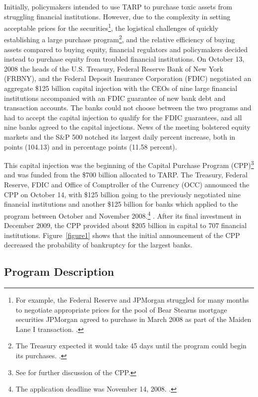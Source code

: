 \documentclass[12pt]{article}
\begin{document}
Initially, policymakers intended to use TARP to purchase toxic assets from struggling financial institutions. However, due to the complexity in setting acceptable prices for the securities\footnote{For example, the Federal Reserve and JPMorgan struggled for many months to negotiate appropriate prices for the pool of Bear Stearns mortgage securities JPMorgan agreed to purchase in March 2008 as part of the Maiden Lane I transaction. \citep{Geithner}.}, the logistical challenges of quickly establishing a large purchase program\footnote{The Treasury expected it would take 45 days until the program could begin its purchases. \citep{Geithner}.}, and the relative efficiency of buying assets compared to buying equity, financial regulators and policymakers decided instead to purchase equity from troubled financial institutions. On October 13, 2008 the heads of the U.S. Treasury, Federal Reserve Bank of New York (FRBNY), and the Federal Deposit Insurance Corporation (FDIC) negotiated an aggregate \$125 billion capital injection with the CEOs of nine large financial institutions accompanied with an FDIC guarantee of new bank debt and transaction accounts. The banks could not choose between the two programs and had to accept the capital injection to qualify for the FDIC guarantees, and all nine banks agreed to the capital injections. News of the meeting bolstered equity markets and the S\&P 500 notched its largest daily percent increase, both in points (104.13) and in percentage points (11.58 percent).

This capital injection was the beginning of the Capital Purchase Program (CPP)\footnote{See \citet{Ross2016b} for further discussion of the CPP.} and was funded from the \$700 billion allocated to TARP. The Treasury, Federal Reserve, FDIC and Office of Comptroller of the Currency (OCC) announced the CPP on October 14, with \$125 billion going to the previously negotiated nine financial institutions and another \$125 billion for banks which applied to the program between October and November 2008.\footnote{The application deadline was November 14, 2008. \citep{CPPInstructions}.} \citep{Paulson}. After its final investment in December 2009, the CPP provided about \$205 billion in capital to 707 financial institutions. Figure~\ref{figure1} shows that the initial announcement of the CPP decreased the probability of bankruptcy for the largest banks.

\subsection{Program Description}
\end{document}
